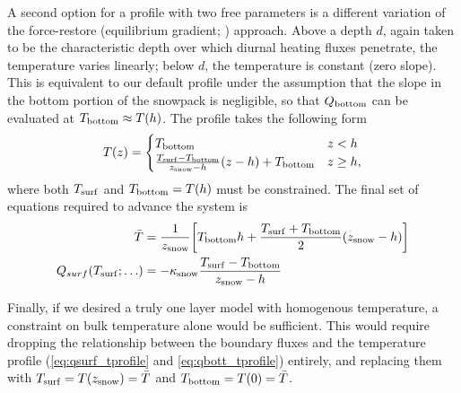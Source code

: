 \documentclass[twoside,10pt]{report}
\begin{document}
A second option for a profile with two free parameters is a different variation of the force-restore (equilibrium gradient; \citet{You2014}) approach. Above a depth $d$, again taken to be the characteristic depth over which diurnal heating fluxes penetrate, the temperature varies linearly; below $d$, the temperature is constant (zero slope). This is equivalent to our default profile under the assumption that the slope in the bottom portion of the snowpack is negligible, so that $Q_{\rm bottom}$ can be evaluated at $T_{\rm bottom} \approx T(h)$. The profile takes the following form
\begin{equation} 
T(z) =
    \begin{cases}
         T_{\rm bottom} & z<h \\
        \frac{T_{\rm surf}-T_{\rm bottom}}{z_{\rm snow}-h}(z-h)+ T_{\rm bottom} & z\geq h,
    \end{cases}
\end{equation}
where both $T_{\rm surf}$ and $T_{\rm bottom} = T(h)$ must be constrained. The final set of equations required to advance the system is
\begin{align}
\bar{T} &=\frac{1}{z_{\rm snow}} \bigg[T_{\rm bottom}h+ \frac{T_{\rm surf}+T_{\rm bottom}}{2}(z_{\rm snow}-h)\bigg] \\
Q_{surf }(T_{\rm surf}; \ldots)& =-\kappa_{\rm snow} \frac{T_{\rm surf}- T_{\rm bottom}}{z_{\rm snow}-h}
\end{align}

Finally, if we desired a truly one layer model with homogenous temperature, a constraint on bulk temperature alone would be sufficient. This would require dropping the relationship between the boundary fluxes and the temperature profile (\eqref{eq:qsurf_tprofile} and \eqref{eq:qbott_tprofile}) entirely, and replacing them with $T_{\rm surf} = T(z_{\rm snow}) = \bar{T}$ and  $T_{\rm bottom} = T(0) =  \bar{T}$.




\end{document}
